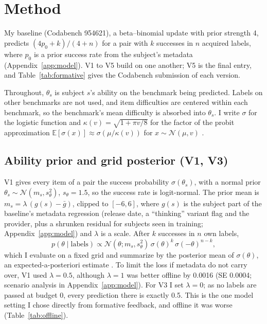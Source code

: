 \section{Method}\label{sec:method}

My baseline (Codabench 954621), a beta--binomial update with prior strength 4, predicts $(4p_0 + k)/(4 + n)$ for a pair with $k$ successes in $n$ acquired labels, where $p_0$ is a prior success rate from the subject's metadata (Appendix~\ref{app:model}). V1 to V5 build on one another; V5 is the final entry, and Table~\ref{tab:formative} gives the Codabench submission of each version.

Throughout, $\theta_s$ is subject $s$'s ability on the benchmark being predicted. Labels on other benchmarks are not used, and item difficulties are centered within each benchmark, so the benchmark's mean difficulty is absorbed into $\theta_s$. I write $\sigma$ for the logistic function and $\kappa(v) = \sqrt{1 + \pi v/8}$ for the factor of the probit approximation $\mathbb{E}[\sigma(x)] \approx \sigma(\mu/\kappa(v))$ for $x \sim \mathcal{N}(\mu, v)$ \citep{mackay1992evidence}.

\subsection{Ability prior and grid posterior (V1, V3)}
V1 gives every item of a pair the success probability $\sigma(\theta_s)$, with a normal prior $\theta_s \sim \mathcal{N}(m_s, s_\theta^2)$, $s_\theta = 1.5$, so the success rate is logit-normal. The prior mean is $m_s = \lambda\,(g(s) - \bar g)$, clipped to $[-6, 6]$, where $g(s)$ is the subject part of the baseline's metadata regression (release date, a ``thinking'' variant flag and the provider, plus a shrunken residual for subjects seen in training; Appendix~\ref{app:model}) and $\lambda$ is a scale. After $k$ successes in $n$ own labels,
\[
  p(\theta \mid \text{labels}) \propto \mathcal{N}(\theta; m_s, s_\theta^2)\, \sigma(\theta)^k\, \sigma(-\theta)^{n-k},
\]
which I evaluate on a fixed grid and summarize by the posterior mean of $\sigma(\theta)$, an expected-a-posteriori estimate \citep{bock1982eap}. To limit the loss if metadata do not carry over, V1 used $\lambda = 0.5$, although $\lambda = 1$ was better offline by 0.0016 (SE 0.0004; scenario analysis in Appendix~\ref{app:model}). For V3 I set $\lambda = 0$; as no labels are passed at budget 0, every prediction there is exactly 0.5. This is the one model setting I chose directly from formative feedback, and offline it was worse (Table~\ref{tab:offline}).

